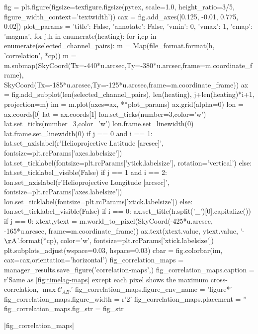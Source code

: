 \begin{pycode}
fig = plt.figure(figsize=texfigure.figsize(pytex, scale=1.0, height_ratio=3/5,
                                           figure_width_context='textwidth'))
cax = fig.add_axes([0.125, -0.01, 0.775, 0.02])
plot_params = {'title': False, 'annotate': False, 'vmin': 0, 'vmax': 1, 'cmap': 'magma',}
for j,h in enumerate(heating):
    for i,cp in enumerate(selected_channel_pairs):
        m = Map(file_format.format(h, 'correlation', *cp))
        m = m.submap(SkyCoord(Tx=-440*u.arcsec,Ty=-380*u.arcsec,frame=m.coordinate_frame),
                     SkyCoord(Tx=-185*u.arcsec,Ty=-125*u.arcsec,frame=m.coordinate_frame))
        ax = fig.add_subplot(len(selected_channel_pairs), len(heating), j+len(heating)*i+1,
                             projection=m)
        im = m.plot(axes=ax, **plot_params)
        ax.grid(alpha=0)
        lon = ax.coords[0]
        lat = ax.coords[1]
        lon.set_ticks(number=3,color='w')
        lat.set_ticks(number=3,color='w')
        lon.frame.set_linewidth(0)
        lat.frame.set_linewidth(0)
        if j == 0 and i == 1:
            lat.set_axislabel(r'Helioprojective Latitude [arcsec]', fontsize=plt.rcParams['axes.labelsize'])
            lat.set_ticklabel(fontsize=plt.rcParams['ytick.labelsize'], rotation='vertical')
        else:
            lat.set_ticklabel_visible(False)
        if j == 1 and i == 2:
            lon.set_axislabel(r'Helioprojective Longitude [arcsec]', fontsize=plt.rcParams['axes.labelsize'])
            lon.set_ticklabel(fontsize=plt.rcParams['xtick.labelsize'])
        else:
            lon.set_ticklabel_visible(False)
        if i == 0:
            ax.set_title(h.split('_')[0].capitalize())
        if j == 0:
            xtext,ytext = m.world_to_pixel(SkyCoord(-425*u.arcsec, -165*u.arcsec, frame=m.coordinate_frame))
            ax.text(xtext.value, ytext.value, '{}-{} $\mathrm{{\AA}}$'.format(*cp),
                    color='w', fontsize=plt.rcParams['xtick.labelsize'])
plt.subplots_adjust(wspace=0.03, hspace=0.03)
cbar = fig.colorbar(im, cax=cax,orientation='horizontal')
fig_correlation_maps = manager_results.save_figure('correlation-maps',)
fig_correlation_maps.caption = r'Same as \autoref{fig:timelag-maps} except each pixel shows the maximum cross-correlation, $\max\mathcal{C}_{AB}$.'
fig_correlation_maps.figure_env_name = 'figure*'
fig_correlation_maps.figure_width = r'2\columnwidth'
fig_correlation_maps.placement = ''
fig_correlation_maps.fig_str = fig_str
\end{pycode}
|fig_correlation_maps|


